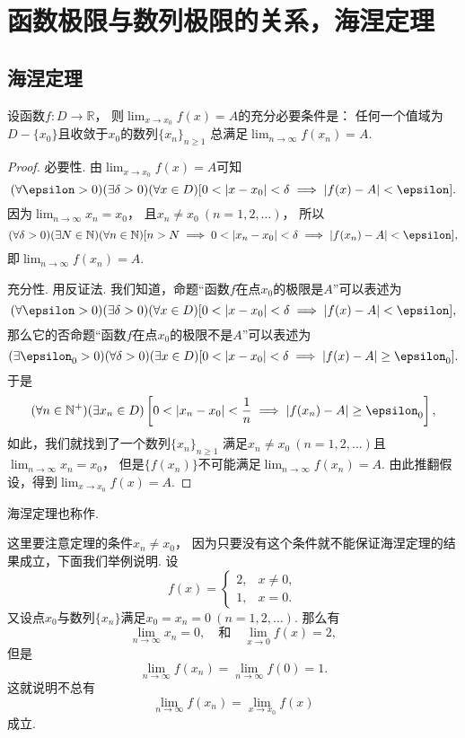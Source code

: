 \section{函数极限与数列极限的关系，海涅定理}
\subsection{海涅定理}
\begin{theorem}[海涅定理]\label{theorem:极限.海涅定理}
设函数\(f\colon D\to\mathbb{R}\)，
则\(\lim_{x \to x_0} f(x) = A\)的充分必要条件是：
任何一个值域为\(D-\{x_0\}\)且收敛于\(x_0\)的数列\(\{x_n\}_{n\geq1}\)
总满足\(\lim_{n\to\infty} f(x_n) = A\).
\begin{proof}
必要性.
由\(\lim_{x \to x_0} f(x) = A\)可知\[
	(\forall\epsilon>0)
	(\exists\delta>0)
	(\forall x\in D)
	[
		0<\abs{x-x_0}<\delta
		\implies
		\abs{f(x)-A}<\epsilon
	].
\]
因为\(\lim_{n\to\infty} x_n = x_0\)，
且\(x_n \neq x_0\ (n=1,2,\dotsc)\)，
所以\[
	(\forall\delta>0)
	(\exists N\in\mathbb{N})
	(\forall n\in\mathbb{N})
	[
		n>N
		\implies
		0<\abs{x_n-x_0}<\delta
		\implies
		\abs{f(x_n)-A}<\epsilon
	],
\]
即\(\lim_{n\to\infty} f(x_n) = A\).

充分性.
用反证法.
我们知道，命题“函数\(f\)在点\(x_0\)的极限是\(A\)”可以表述为\[
	(\forall\epsilon>0)
	(\exists\delta>0)
	(\forall x\in D)
	[
		0<\abs{x-x_0}<\delta
		\implies
		\abs{f(x)-A}<\epsilon
	],
\]
那么它的否命题“函数\(f\)在点\(x_0\)的极限不是\(A\)”可以表述为\[
	(\exists\epsilon_0>0)
	(\forall\delta>0)
	(\exists x\in D)
	[
		0<\abs{x-x_0}<\delta
		\implies
		\abs{f(x)-A}\geq\epsilon_0
	].
\]
于是\[
	(\forall n\in\mathbb{N}^+)
	(\exists x_n\in D)
	\left[
		0<\abs{x_n-x_0}<\frac1n
		\implies
		\abs{f(x_n)-A}\geq\epsilon_0
	\right],
\]
如此，我们就找到了一个数列\(\{x_n\}_{n\geq1}\)
满足\(x_n\neq x_0\ (n=1,2,\dotsc)\)且\(\lim_{n\to\infty} x_n = x_0\)，
但是\(\{f(x_n)\}\)不可能满足\(\lim_{n\to\infty} f(x_n) = A\).
由此推翻假设，得到\(\lim_{x\to x_0} f(x) = A\).
\end{proof}
\end{theorem}
海涅定理也称作.

这里要注意定理的条件\(x_n \neq x_0\)，
因为只要没有这个条件就不能保证海涅定理的结果成立，下面我们举例说明.
设\[
	f(x) = \left\{ \begin{array}{cl}
		2, & x\neq0, \\
		1, & x=0.
	\end{array} \right.
\]
又设点\(x_0\)与数列\(\{x_n\}\)满足\(x_0=x_n=0\ (n=1,2,\dotsc)\).
那么有\[
	\lim_{n\to\infty} x_n = 0,
	\quad\text{和}\quad
	\lim_{x\to0} f(x) = 2,
\]
但是\[
	\lim_{n\to\infty} f(x_n) = \lim_{n\to\infty} f(0) = 1.
\]这就说明不总有\[
	\lim_{n\to\infty} f(x_n)
	= \lim_{x \to x_0} f(x)
\]成立.

